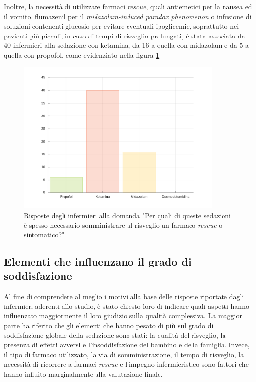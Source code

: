 Inoltre, la necessità di utilizzare farmaci \emph{rescue}, quali antiemetici per la nausea ed il vomito, flumazenil per il \emph{midazolam-induced paradox phenomenon} o infusione di soluzioni contenenti glucosio per evitare eventuali ipoglicemie, soprattutto nei pazienti più piccoli, in caso di tempi di risveglio prolungati, è stata associata da 40 infermieri alla sedazione con ketamina, da 16 a quella con midazolam e da 5 a quella con propofol, come evidenziato nella figura \ref{fig:rescue}.

\begin{figure}[!h]
    \centering
    \includegraphics[width=0.9\textwidth]{Figure/rescue.pdf}
    \caption{Risposte degli infermieri alla domanda "Per quali di queste sedazioni è spesso necessario somministrare al risveglio un farmaco \emph{rescue} o sintomatico?"}
    \label{fig:rescue}
\end{figure}


\subsection*{Elementi che influenzano il grado di soddisfazione}

Al fine di comprendere al meglio i motivi alla base delle risposte riportate dagli infermieri aderenti allo studio, è stato chiesto loro di indicare quali aspetti hanno influenzato maggiormente il loro giudizio sulla qualità complessiva. La maggior parte ha riferito che gli elementi che hanno pesato di più sul grado di soddisfazione globale della sedazione sono stati: la qualità del risveglio, la presenza di effetti avversi e l'insoddisfazione del bambino e della famiglia. Invece, il tipo di farmaco utilizzato, la via di somministrazione, il tempo di risveglio, la necessità di ricorrere a farmaci \emph{rescue} e l'impegno infermieristico sono fattori che hanno influito marginalmente alla valutazione finale.

